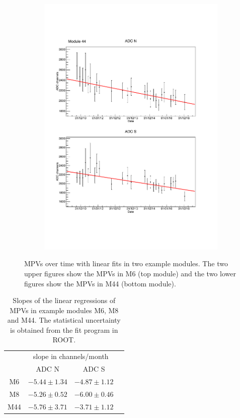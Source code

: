 \begin{figure}[htb]
\begin{subfigure}{0.55\linewidth}
    \includegraphics[width=\linewidth{}]{./fig/M44mpv.pdf}
    \caption{}
    \label{fig:MPV_M44}
  \end{subfigure}
  \caption{MPVs over time with linear fits in two example modules. The two upper figures show the MPVs in M6 (top module) and the two lower figures show the MPVs in M44 (bottom module).}
  \label{fig:MPV}
\end{figure}
%

\begin{table}[hb]
  \centering
  \caption{Slopes of the linear regressions of MPVs in example modules M6, M8 and M44. The statistical uncertainty is obtained from the fit program in ROOT. }
  \label{tab:mpv}
  \begin{tabular}{c c c c}
  \toprule
        & \multicolumn{2}{c}{slope in channels/month} \\
        & ADC N & ADC S \\
  \midrule
  M6  & $-5.44\pm1.34$ & $-4.87\pm1.12$ \\
  M8  & $-5.26\pm0.52$ & $-6.00\pm0.46$ \\
  M44 & $-5.76\pm3.71$ & $-3.71\pm1.12$ \\
  \bottomrule
  \end{tabular}
\end{table}




